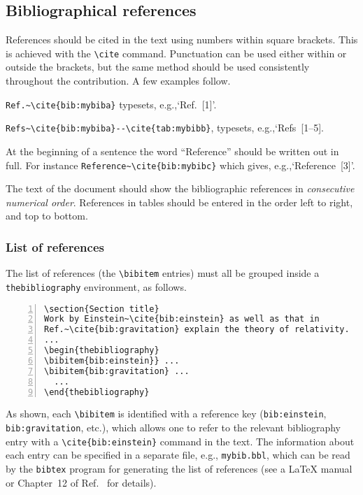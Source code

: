 \documentclass{cernphprep}
\makeatletter
\providecommand*\eg{e.g.,\xspace}
\providecommand*\etc{etc.\@\xspace}
\makeatother
\begin{document}
\subsection{Bibliographical references}
\label{sec:biblioref}

References should be cited in the text using numbers within square
brackets. This is achieved with the \verb!\cite! command. Punctuation
can be used either within or outside the brackets, but the same method
should be used consistently throughout the contribution. A few examples follow.
\begin{Itemize}
\item \verb!Ref.~\cite{bib:mybiba}!  typesets, \eg `Ref.~[1]'.
\item \verb!Refs~\cite{bib:mybiba}--\cite{tab:mybibb}!, 
      typesets, \eg `Refs~[1--5].
\item At the beginning of a sentence the word ``Reference'' should be
       written out in full. For instance \verb!Reference~\cite{bib:mybibc}!
       which gives, \eg `Reference~[3]'.
\end{Itemize}

The text of the document should show the bibliographic references in
\emph{consecutive numerical order}. References in tables should be
entered in the order left to right, and top to bottom.

\subsubsection{List of references}

The list of references (the \verb!\bibitem! entries) must all be
grouped inside a \texttt{thebibliography} environment, as follows.
\begin{Verbatim}[numbers=left,fontsize=\small]
\section{Section title}
Work by Einstein~\cite{bib:einstein} as well as that in
Ref.~\cite{bib:gravitation} explain the theory of relativity.
...
\begin{thebibliography}
\bibitem{bib:einstein}} ...
\bibitem{bib:gravitation} ...
  ...
\end{thebibliography}
\end{Verbatim}
As shown, each \verb!\bibitem! is identified with a reference key
(\texttt{bib:einstein}, \texttt{bib:gravitation}, \etc), which allows
one to refer to the relevant bibliography entry with a
\verb|\cite{bib:einstein}| command in the text. The information about
each entry can be specified in a separate file, \eg
\texttt{mybib.bbl}, which can be read by the \texttt{bibtex} program
for generating the list of references (see a \LaTeX{} manual or
Chapter~12 of Ref.~\cite{bib:mittelbach2004} for details).
\end{document}

